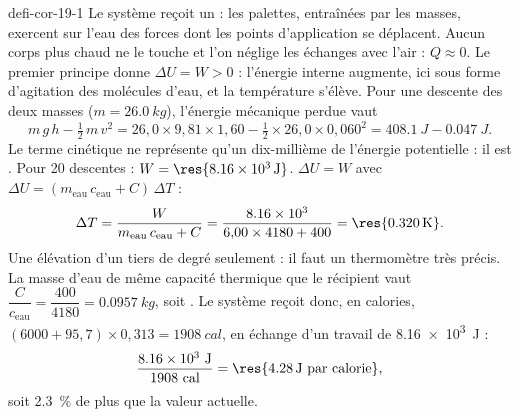 \begin{blocEdition}{defi-cor-19-1}
Le système reçoit un  : les palettes, entraînées par les masses, exercent sur l'eau des forces dont
les points d'application se déplacent. Aucun corps plus chaud ne le touche et l'on néglige les échanges avec l'air :
$Q\approx0$. Le premier principe donne $\Delta U=W>0$ : l'énergie interne augmente, ici sous forme d'agitation des
molécules d'eau, et la température s'élève.
Pour une descente des deux masses ($m=\qty{26,0}{kg}$), l'énergie mécanique perdue vaut
\[m\,g\,h-\tfrac12\,m\,v^2=26{,}0\times9{,}81\times1{,}60-\tfrac12\times26{,}0\times0{,}060^2=\qty{408,1}{J}-\qty{0,047}{J}.\]
Le terme cinétique ne représente qu'un dix-millième de l'énergie potentielle : il est . Pour
20 descentes : $W=\res{\qty{8,16e3}{J}}$.
$\Delta U=W$ avec $\Delta U=(m_\mathrm{eau}\,c_\mathrm{eau}+C)\,\Delta T$ :
\[\Delta T=\frac{W}{m_\mathrm{eau}\,c_\mathrm{eau}+C}=\frac{\num{8.16e3}}{6{,}00\times4180+400}=\res{\qty{0,320}{K}}.\]
Une élévation d'un tiers de degré seulement : il faut un thermomètre très précis.
La masse d'eau de même capacité thermique que le récipient vaut $\dfrac{C}{c_\mathrm{eau}}=\dfrac{400}{4180}=\qty{0,0957}{kg}$, soit
. Le système reçoit donc, en calories, $(6000+95{,}7)\times0{,}313=\qty{1908}{cal}$, en échange d'un travail de
\qty{8,16e3}{J} :
\[\frac{\num{8.16e3}\ \text{J}}{\num{1908}\ \text{cal}}=\res{\qty{4,28}{J}\ \text{par calorie}},\]
soit \qty{2,3}{\percent} de plus que la valeur actuelle.
\end{blocEdition}


